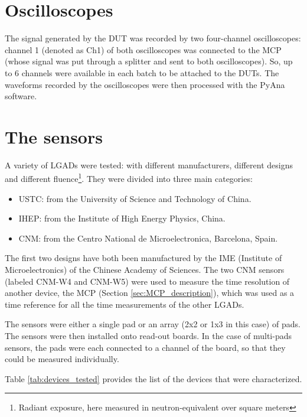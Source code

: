 \section{Oscilloscopes}
The signal generated by the DUT was recorded by two four-channel oscilloscopes: channel 1 (denoted as Ch1) of both oscilloscopes was connected to the MCP (whose signal was put through a splitter and sent to both oscilloscopes). So, up to 6 channels were available in each batch to be attached to the DUTs.
The waveforms recorded by the oscilloscopes were then processed with the PyAna software. 


\section{The sensors}\label{sec:the_sensors}
A variety of LGADs were tested: with different manufacturers, different designs and different fluence\footnote{Radiant exposure, here measured in neutron-equivalent over square meters}. They were divided into three main categories:
\begin{itemize}
    \item USTC: from the University of Science and Technology of China.
    \item IHEP: from the Institute of High Energy Physics, China.
    \item CNM: from the Centro National de Microelectronica, Barcelona, Spain.
\end{itemize}

The first two designs have both been manufactured by the IME (Institute of Microelectronics) of the Chinese Academy of Sciences. The two CNM sensors (labeled CNM-W4 and CNM-W5) were used to measure the time resolution of another device, the MCP (Section \ref{sec:MCP_description}), which was used as a time reference for all the time measurements of the other LGADs. 

The sensors were either a single pad or an array (2x2 or 1x3 in this case) of pads. The sensors were then installed onto read-out boards. In the case of multi-pads sensors, the pads were each connected to a channel of the board, so that they could be measured individually.

Table \ref{tab:devices_tested} provides the list of the devices that were characterized. %

